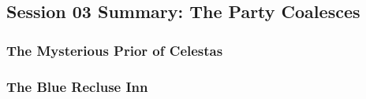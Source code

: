 \subsection{Session 03 Summary: The Party Coalesces}

\subsubsection{The Mysterious Prior of Celestas}

\subsubsection{The Blue Recluse Inn}